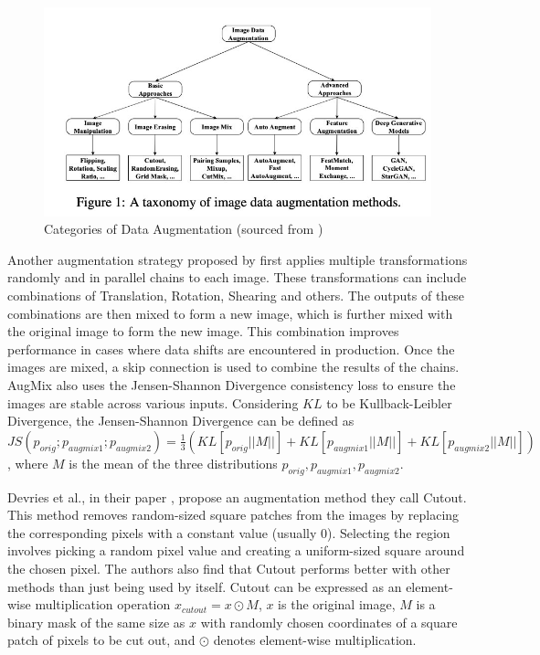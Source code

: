\begin{figure}[htbp]
    \centering
    \includegraphics[width=.9\textwidth]{images/data_aug_categories.png}
    \caption{Categories of Data Augmentation (sourced from \cite{yangImageDataAugmentation2022})}
    \label{fig:categorization_augmentation}
\end{figure}

Another augmentation strategy proposed by \cite{hendrycksAugMixSimpleData2020} first applies multiple transformations randomly and in parallel chains to each image. These transformations can include combinations of Translation, Rotation, Shearing and others. The outputs of these combinations are then mixed to form a new image, which is further mixed with the original image to form the new image. This combination improves performance in cases where data shifts are encountered in production. Once the images are mixed, a skip connection is used to combine the results of the chains. AugMix also uses the Jensen-Shannon Divergence consistency loss \cite{linDivergenceMeasuresBased} to ensure the images are stable across various inputs. Considering $KL$ to be Kullback-Leibler Divergence, the Jensen-Shannon Divergence can be defined as $
    JS(p_{orig}; p_{augmix1};p_{augmix2}) = \frac{1}{3}(KL[p_{orig}||M||]+KL[p_{augmix1}||M||]+KL[p_{augmix2}||M||])
$, where $M$ is the mean of the three distributions $p_{orig}, p_{augmix1}, p_{augmix2}$.

Devries et al., in their paper \cite{devriesImprovedRegularizationConvolutional2017}, propose an augmentation method they call Cutout. This method removes random-sized square patches from the images by replacing the corresponding pixels with a constant value (usually 0). Selecting the region involves picking a random pixel value and creating a uniform-sized square around the chosen pixel. The authors also find that Cutout performs better with other methods than just being used by itself. Cutout can be expressed as an element-wise multiplication operation $x_{cutout} = x \odot M$,
$x$ is the original image, $M$ is a binary mask of the same size as $x$ with randomly chosen coordinates of a square patch of pixels to be cut out, and $\odot$ denotes element-wise multiplication.

